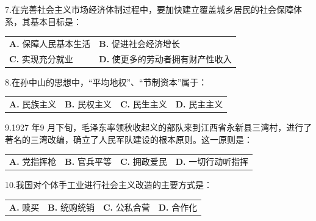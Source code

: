 \documentclass[UTF8,11pt]{ctexart}
\begin{document}
7.在完善社会主义市场经济体制过程中，要加快建立覆盖城乡居民的社会保障体系，其基本目标是：


\begin{center}\begin{tabular}{>{\raggedright\arraybackslash}p{\dimexpr(\linewidth-4\tabcolsep)/2\relax}>{\raggedright\arraybackslash}p{\dimexpr(\linewidth-4\tabcolsep)/2\relax}}
\textbf{A.} 保障人民基本生活 & \textbf{B.} 促进社会经济增长\\[.35em]
\textbf{C.} 实现充分就业 & \textbf{D.} 使更多的劳动者拥有财产性收入\\[.35em]\end{tabular}\end{center}

8.在孙中山的思想中，“平均地权”、“节制资本”属于：


\begin{center}\begin{tabular}{>{\raggedright\arraybackslash}p{\dimexpr(\linewidth-8\tabcolsep)/4\relax}>{\raggedright\arraybackslash}p{\dimexpr(\linewidth-8\tabcolsep)/4\relax}>{\raggedright\arraybackslash}p{\dimexpr(\linewidth-8\tabcolsep)/4\relax}>{\raggedright\arraybackslash}p{\dimexpr(\linewidth-8\tabcolsep)/4\relax}}
\textbf{A.} 民族主义 & \textbf{B.} 民权主义 & \textbf{C.} 民生主义 & \textbf{D.} 民主主义\\[.35em]\end{tabular}\end{center}

9.1927 年9 月下旬，毛泽东率领秋收起义的部队来到江西省永新县三湾村，进行了著名的三湾改编，确立了人民军队建设的根本原则。这一原则是：


\begin{center}\begin{tabular}{>{\raggedright\arraybackslash}p{\dimexpr(\linewidth-8\tabcolsep)/4\relax}>{\raggedright\arraybackslash}p{\dimexpr(\linewidth-8\tabcolsep)/4\relax}>{\raggedright\arraybackslash}p{\dimexpr(\linewidth-8\tabcolsep)/4\relax}>{\raggedright\arraybackslash}p{\dimexpr(\linewidth-8\tabcolsep)/4\relax}}
\textbf{A.} 党指挥枪 & \textbf{B.} 官兵平等 & \textbf{C.} 拥政爱民 & \textbf{D.} 一切行动听指挥\\[.35em]\end{tabular}\end{center}

10.我国对个体手工业进行社会主义改造的主要方式是：


\begin{center}\begin{tabular}{>{\raggedright\arraybackslash}p{\dimexpr(\linewidth-8\tabcolsep)/4\relax}>{\raggedright\arraybackslash}p{\dimexpr(\linewidth-8\tabcolsep)/4\relax}>{\raggedright\arraybackslash}p{\dimexpr(\linewidth-8\tabcolsep)/4\relax}>{\raggedright\arraybackslash}p{\dimexpr(\linewidth-8\tabcolsep)/4\relax}}
\textbf{A.} 赎买 & \textbf{B.} 统购统销 & \textbf{C.} 公私合营 & \textbf{D.} 合作化\\[.35em]\end{tabular}\end{center}
\end{document}
